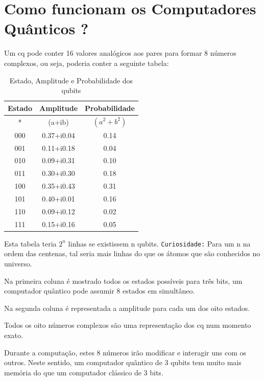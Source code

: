 \documentclass{report}
\begin{document}
\clearpage
\null
\chapter{Como funcionam os Computadores Quânticos ?}
\label{chap.Como funcionam ?}

	Um \ac{cq} pode conter 16 valores analógicos aos pares para formar 8 números complexos, ou seja, poderia conter a seguinte tabela:

\begin{center}
\begin{table}
\begin{tabular}{|c |c |c|}
\hline
 Estado & Amplitude & Probabilidade \\ 
 \hline
  * & (a+ib) & $(a^2 + b^2 )$ \\
 \hline  
 000 & 0.37+i0.04 & 0.14 \\
 \hline
 001 & 0.11+i0.18 & 0.04 \\
 \hline
 010 & 0.09+i0.31 & 0.10 \\
 \hline
 011 & 0.30+i0.30 & 0.18 \\
 \hline
 100 & 0.35+i0.43 & 0.31 \\
 \hline
 101 & 0.40+i0.01 & 0.16 \\
 \hline
 110 & 0.09+i0.12 & 0.02 \\
 \hline
 111 & 0.15+i0.16 & 0.05 \\
 \hline
\end{tabular}
\centering
\caption{Estado, Amplitude e Probabilidade dos qubits}
\end{table}
\end{center}



	Esta tabela teria $2^n$ linhas se existissem n qubits.
 \verb|Curiosidade:| Para um n na ordem das centenas, tal seria mais linhas do que os átomos que são conhecidos no universo.
 
	Na primeira coluna é mostrado todos os estados possíveis para três bits, um computador quântico pode assumir 8 estados em simultâneo.

	Na segunda coluna é representada a amplitude para cada um dos oito estados.

	Todos os oito números complexos são uma representação dos \ac{cq} 
num momento exato.

	 Durante a computação, estes 8 números irão modificar e interagir uns com os outros. Neste sentido, um computador quântico de 3 qubits tem muito mais memória do que um computador clássico de 3 bits.
 
\end{document}
